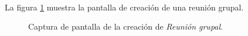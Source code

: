   \paragraph{}La figura \ref{capturaReunionGrupal} muestra la pantalla de
  creación de una reunión grupal.

  \begin{figure}[!ht]
    \begin{center}
      \caption{Captura de pantalla de la creación de \textit{Reunión grupal}.}
      \label{capturaReunionGrupal}
    \end{center}
  \end{figure}
